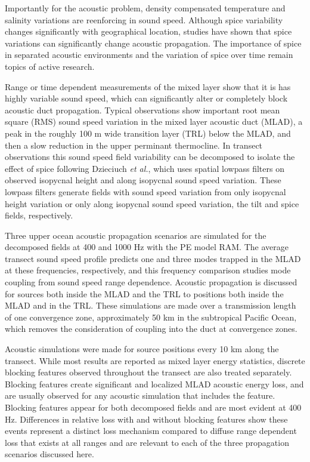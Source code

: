 \documentclass[preprint,NumberedRefs]{JASA}
\begin{document}
Importantly for the acoustic problem, density compensated temperature and salinity variations are reenforcing in sound speed. Although spice variability changes significantly with geographical location, studies have shown that spice variations can significantly change acoustic propagation\citep{colosi12,colosi13,murat2021}. The importance of spice in separated acoustic environments and the variation of spice over time remain topics of active research.

Range or time dependent measurements of the mixed layer show that it is has highly variable sound speed\citep{cole2010seasonal,rudnick1999compensation,klymak2015}, which can significantly alter or completely block acoustic duct propagation\citep{colosi2020observations,colosi21}. Typical observations show important root mean square (RMS) sound speed variation in the mixed layer acoustic duct (MLAD), a peak in the roughly 100 m wide transition layer (TRL) below the MLAD, and then a slow reduction in the upper perminant thermocline. In transect observations this sound speed field variability can be decomposed to isolate the effect of spice following Dzieciuch \emph{et al.}\citep{dzieciuch2004}, which uses spatial lowpass filters on observed isopycnal height and along isopycnal sound speed variation. These lowpass filters generate fields with sound speed variation from only isopycnal height variation or only along isopycnal sound speed variation, the tilt and spice fields, respectively.

Three upper ocean acoustic propagation scenarios are simulated for the decomposed fields at 400 and 1000 Hz with the PE model RAM\cite{collins93}. The average transect sound speed profile predicts one and three modes trapped in the MLAD at these frequencies, respectively, and this frequency comparison studies mode coupling from sound speed range dependence. Acoustic propagation is discussed for sources both inside the MLAD and the TRL to positions both inside the MLAD and in the TRL. These simulations are made over a transmission length of one convergence zone\citep{jensen2011computational}, approximately 50 km in the subtropical Pacific Ocean, which removes the consideration of coupling into the duct at convergence zones\citep{colosi2020observations}.

Acoustic simulations were made for source positions every 10 km along the transect. While most results are reported as mixed layer energy statistics, discrete blocking features\citep{colosi2020observations} observed throughout the transect are also treated separately. Blocking features create significant and localized MLAD acoustic energy loss, and are usually observed for any acoustic simulation that includes the feature. Blocking features appear for both decomposed fields and are most evident at 400 Hz. Differences in relative loss with and without blocking features show these events represent a distinct loss mechanism compared to diffuse range dependent loss that exists at all ranges and are relevant to each of the three propagation scenarios discussed here.
\end{document}
